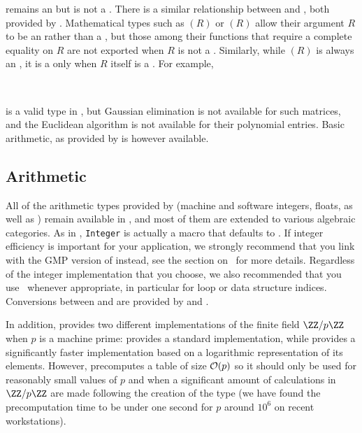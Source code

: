 \begin{itemize}
 remains an  but is
not a .
There is a similar relationship between 
and , both provided by \libalgebra.
Mathematical types such as
$(R)$ or
$(R)$
allow their argument $R$ to be an  rather
than a , but those among their functions that require
a complete equality on $R$ are not exported when $R$ is not a .
Similarly, while $(R)$ is always an
, it is a  only when $R$ itself
is a . For example,\\
\vspace{-5mm}
\begin{center}
~~
\end{center}
is a valid type in \libalgebra, but Gaussian elimination is not available for
such matrices, and the Euclidean algorithm is not available for their
polynomial entries. Basic arithmetic, as provided by 
is however available.
\end{itemize}

\subsection{Arithmetic}
All of the arithmetic types provided by \libaldor (machine and software
integers, floats, as well as ) remain available
in \libalgebra, and most of them are extended to various algebraic categories.
As in \libaldor, {\tt Integer} is actually a macro that defaults to
. If integer efficiency is important for your application,
we strongly recommend that you link with the GMP version of
\libalgebra instead,
see the section on~ for
more details. Regardless of the integer implementation that you choose,
we also recommended that you use~ whenever
appropriate, in particular for loop
or data structure indices. Conversions between
and  are provided by 
and .

In addition, \libalgebra{}
provides two different implementations of the finite field $\ZZ / p\ZZ$
when $p$ is a machine prime:  provides a
standard implementation, while  provides
a significantly faster implementation based on a logarithmic
representation of its elements.
However, 
precomputes a table of size ${\cal O}(p)$ so it should only be used
for reasonably small values of $p$ and when a significant amount
of calculations in $\ZZ / p\ZZ$ are made following the creation
of the type (we have found the precomputation time to be under one second
for $p$ around $10^6$ on recent workstations).

